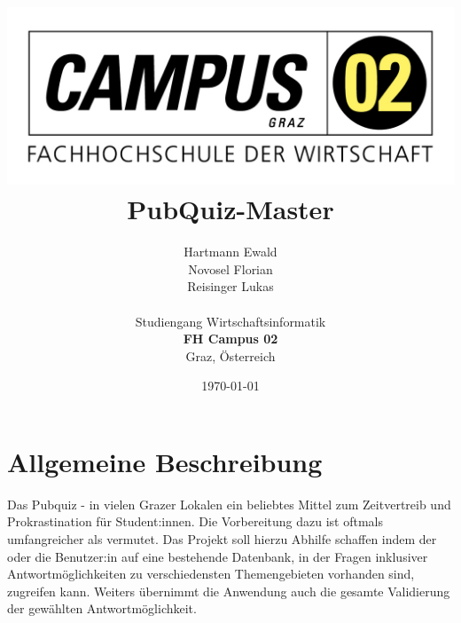 \documentclass[a4paper]{article}
\begin{document}
\begin{titlepage}
\title{
\includegraphics{figures/Logo.jpg} \\
\vspace*{1in}
\textbf{PubQuiz-Master}}
\author{Hartmann Ewald\\
        Novosel Florian\\
        Reisinger Lukas\\
		\vspace*{0.5in} \\
		Studiengang Wirtschaftsinformatik\\
        \textbf{FH Campus 02}\\
        Graz, Österreich
       } \date{\today}
\setlength{\oddsidemargin}{0in} \setlength{\evensidemargin}{0in}
\setlength{\topmargin}{2in}     \setlength{\headsep}{-.25in}
\setlength{\textwidth}{6.5in}   \setlength{\textheight}{8.5in}
\setlength{\parindent}{1cm}

\maketitle
\thispagestyle{empty}
\setcounter{page}{0}
\end{titlepage}
\clearpage

\begingroup
\hypersetup{linkcolor=black}
\tableofcontents
\endgroup
\clearpage

\section{Allgemeine Beschreibung}
Das Pubquiz - in vielen Grazer Lokalen ein beliebtes Mittel zum Zeitvertreib und Prokrastination für Student:innen. Die Vorbereitung dazu ist oftmals umfangreicher als vermutet. Das Projekt soll hierzu Abhilfe schaffen indem der oder die Benutzer:in auf eine bestehende Datenbank, in der Fragen inklusiver Antwortmöglichkeiten zu verschiedensten Themengebieten vorhanden sind, zugreifen kann. Weiters übernimmt die Anwendung auch die gesamte Validierung der gewählten Antwortmöglichkeit. 
\end{document}
